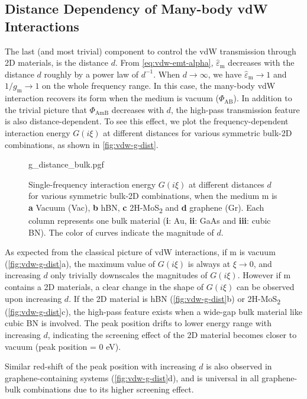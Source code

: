 \subsection{Distance Dependency of Many-body vdW Interactions}
\label{sec:vdw-distance}

The last (and most trivial) component to control the vdW transmission
through 2D materials, is the distance $d$.  From
\autoref{eq:vdw-emt-alpha}, \(\hat{\varepsilon}_{\mathrm{m}}\)
decreases with the distance \(d\) roughly by a power law of
\(d^{-1}\). When \(d \to \infty\), we have
\(\hat{\varepsilon}_{\mathrm{m}} \to 1\) and
\(1/g_{\mathrm{m}} \to 1\) on the whole frequency range. In this
case, the many-body vdW interaction recovers its form when the medium
is vacuum ($\Phi_{\mathrm{AB}}$).
%
In addition to the trivial picture that $\Phi_{\mathrm{AmB}}$
decreases with $d$, the high-pass transmission feature is also
distance-dependent.
%
To see this effect, we plot the frequency-dependent interaction energy
\(G(i \xi)\) at different distances for various symmetric bulk-2D
combinations, as shown in \autoref{fig:vdw-g-dist}.
%
\begin{figure}[!htbp]
  \centering
  {g_distance_bulk.pgf}
  \caption{\label{fig:vdw-g-dist}%
    Single-frequency interaction energy $G(i\xi)$ at different
    distances $d$ for various symmetric bulk-2D combinations, when the
    medium m is \textbf{a} Vacuum (Vac), \textbf{b} hBN, \textbf{c}
    2H-MoS\textsubscript{2} and \textbf{d} graphene (Gr).  Each column
    represents one bulk material (\textbf{i}: Au, \textbf{ii}: GaAs
    and \textbf{iii}: cubic BN). The color of curves indicate the
    magnitude of $d$.  }
\end{figure}

As expected from the classical picture of vdW interactions, if m is
vacuum (\autoref{fig:vdw-g-dist}a), the maximum value of $G(i \xi)$ is
always at $\xi \to 0$, and increasing $d$ only trivially down\-scales
the magnitudes of $G(i \xi)$.
%
However if m contains a 2D materials, a clear change in the shape of
\(G(i \xi)\) can be observed upon increasing $d$.
%
If the 2D material is hBN (\autoref{fig:vdw-g-dist}b) or
2H-MoS\textsubscript{2} (\autoref{fig:vdw-g-dist}c), the high-pass
feature exists when a wide-gap bulk material like cubic BN is
involved. The peak position drifts to lower energy range with
increasing $d$, indicating the screening effect of the 2D material
becomes closer to vacuum (peak position = 0 eV).

Similar red-shift of the peak position with increasing \(d\) is also
observed in graphene-containing systems (\autoref{fig:vdw-g-dist}d),
and is universal in all graphene-bulk combinations due to its higher
screening effect.



